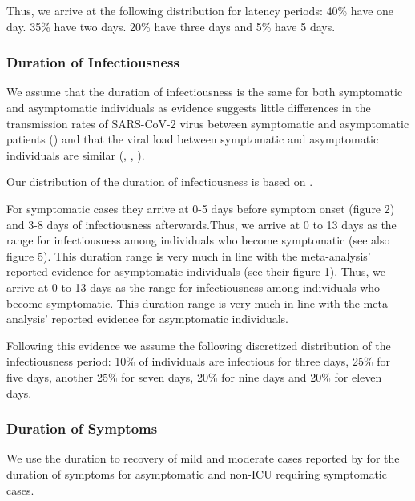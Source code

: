 Thus, we arrive at the following distribution for latency periods: 40\% have one day.
35\% have two days. 20\% have three days and 5\% have 5 days.


\subsubsection{Duration of Infectiousness}

We assume that the duration of infectiousness is the same for both symptomatic and
asymptomatic individuals as evidence suggests little differences in the transmission
rates of SARS-CoV-2 virus between symptomatic and asymptomatic patients
(\citet{Yin2020}) and that the viral load between symptomatic and asymptomatic
individuals are similar (\citet{Zou2020}, \citet{Byrne2020}, \citet{Singanayagam2020}).

Our distribution of the duration of infectiousness is based on \citet{Byrne2020}.

For symptomatic cases they arrive at 0-5 days before symptom onset (figure 2) and 3-8
days of infectiousness afterwards.\footnotemark Thus, we arrive at 0 to 13 days as the
range for infectiousness among individuals who become symptomatic (see also figure 5).
This duration range is very much in line with the meta-analysis’ reported evidence for
asymptomatic individuals (see their figure 1). Thus, we arrive at 0 to 13 days as the
range for infectiousness among individuals who become symptomatic. This duration range
is very much in line with the meta-analysis' reported evidence for asymptomatic
individuals.



Following this evidence we assume the following discretized distribution of the
infectiousness period: 10\% of individuals are infectious for three days, 25\% for five
days, another 25\% for seven days, 20\% for nine days and 20\% for eleven days.


\subsubsection{Duration of Symptoms}

We use the duration to recovery of mild and moderate cases reported by \cite[Figure~S3,
Panel~2]{Bi2020} for the duration of symptoms for asymptomatic and non-ICU requiring
symptomatic cases.

